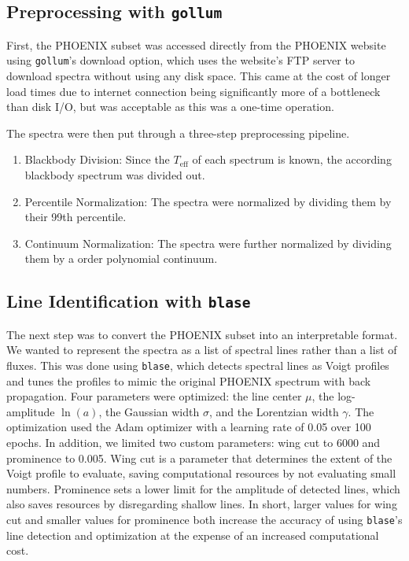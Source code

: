 \documentclass[twocolumn]{aastex631}
\begin{document}
\subsection{Preprocessing with \texttt{gollum}}
First, the PHOENIX subset was accessed directly from the PHOENIX website
using \texttt{gollum}'s download option, which uses the website's FTP server
to download spectra without using any disk space. This came at the cost of
longer load times due to internet connection being significantly more of a
bottleneck than disk I/O, but was acceptable as this was a one-time operation.

The spectra were then put through a three-step preprocessing pipeline.
\begin{enumerate}
    \item Blackbody Division: Since the $T_{\mathrm{eff}}$ of each spectrum 
    is known, the according blackbody spectrum was divided out.
    \item Percentile Normalization: The spectra were normalized by dividing
    them by their 99th percentile.
    \item Continuum Normalization: The spectra were further normalized by 
    dividing them by a  order polynomial continuum.
\end{enumerate}

\subsection{Line Identification with \texttt{blase}}
The next step was to convert the PHOENIX subset into an interpretable format.
We wanted to represent the spectra as a list of spectral lines rather than a
list of fluxes. This was done using \texttt{blase}, which detects spectral 
lines as Voigt profiles and tunes the profiles to mimic the original 
PHOENIX spectrum with back propagation. Four parameters were optimized: the 
line center $\mu$, the log-amplitude $\ln(a)$, the Gaussian width $\sigma$, and the 
Lorentzian width $\gamma$. The optimization used the Adam optimizer with a
learning rate of 0.05 over 100 epochs. In addition, we limited two custom 
parameters: wing cut to 6000 and prominence to 0.005. Wing cut is a parameter
that determines the extent of the Voigt profile to evaluate, saving
computational resources by not evaluating small numbers. Prominence sets a
lower limit for the amplitude of detected lines, which also saves resources 
by disregarding shallow lines. In short, larger values for wing cut and 
smaller values for prominence both increase the accuracy of using
\texttt{blase}'s line detection and optimization at the expense of an
increased computational cost.
\end{document}
